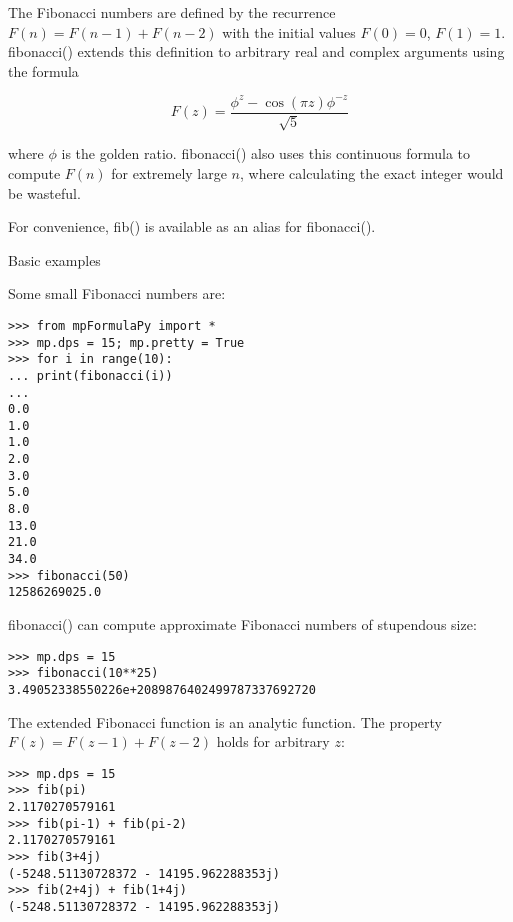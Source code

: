 \vpara
The Fibonacci numbers are defined by the recurrence $F(n)=F(n-1)+F(n-2)$ with the initial values $F(0)=0$, $F(1)=1$. fibonacci() extends this definition to arbitrary real and complex arguments using the formula

\begin{equation}
F(z) = \frac{\phi^z - \cos(\pi z) \phi^{-z}}{\sqrt{5}}
\end{equation}

where $\phi$ is the golden ratio. fibonacci() also uses this continuous formula to compute $F(n)$ for extremely large $n$, where calculating the exact integer would be wasteful.

For convenience, fib() is available as an alias for fibonacci().

Basic examples

Some small Fibonacci numbers are:

\begin{lstlisting}
>>> from mpFormulaPy import *
>>> mp.dps = 15; mp.pretty = True
>>> for i in range(10):
... print(fibonacci(i))
...
0.0
1.0
1.0
2.0
3.0
5.0
8.0
13.0
21.0
34.0
>>> fibonacci(50)
12586269025.0
\end{lstlisting}


fibonacci() can compute approximate Fibonacci numbers of stupendous size:

\begin{lstlisting}
>>> mp.dps = 15
>>> fibonacci(10**25)
3.49052338550226e+2089876402499787337692720
\end{lstlisting}



The extended Fibonacci function is an analytic function. The property $F(z)=F(z-1)+F(z-2)$ holds for arbitrary $z$:

\begin{lstlisting}
>>> mp.dps = 15
>>> fib(pi)
2.1170270579161
>>> fib(pi-1) + fib(pi-2)
2.1170270579161
>>> fib(3+4j)
(-5248.51130728372 - 14195.962288353j)
>>> fib(2+4j) + fib(1+4j)
(-5248.51130728372 - 14195.962288353j)
\end{lstlisting}



%
%
%
%
%
%
%
%
%
%
%



